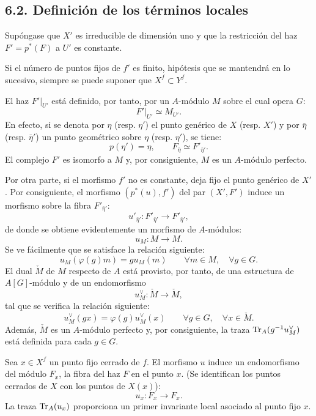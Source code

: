 \subsection*{6.2. Definición de los términos locales}
Supóngase que $X'$ es irreducible de dimensión uno y que la restricción del haz $F'=p^*(F)$ a $U'$ es constante.

Si el número de puntos fijos de $f'$ es finito, hipótesis que se mantendrá en lo sucesivo, siempre se puede suponer que $X^f \subset Y^f$.

El haz $F'|_{U'}$ está definido, por tanto, por un $A$-módulo $M$ sobre el cual opera $G$:
\[
F'|_{U'} \simeq M_{U'} .
\]
En efecto, si se denota por $\eta$ (resp. $\eta'$) el punto genérico de $X$ (resp. $X'$) y por $\bar\eta$ (resp. $\bar\eta'$) un punto geométrico sobre $\eta$ (resp. $\eta'$), se tiene:
\[
p(\eta')=\eta,\qquad F_{\bar\eta} \simeq F'_{\bar\eta'} .
\]
El complejo $F'$ es isomorfo a $M$ y, por consiguiente, $M$ es un $A$-módulo perfecto.

Por otra parte, si el morfismo $f'$ no es constante, deja fijo el punto genérico de $X'$. Por consiguiente, el morfismo $(p^*(u),f')$ del par $(X',F')$ induce un morfismo sobre la fibra $F'_{\bar\eta'}$:
\[
u'_{\bar\eta'}:F'_{\bar\eta'}\longrightarrow F'_{\bar\eta'} ,
\]
de donde se obtiene evidentemente un morfismo de $A$-módulos:
\[
u_M:M\longrightarrow M .
\]
Se ve fácilmente que se satisface la relación siguiente:
\begin{equation}\tag{6.2.1}
u_M(\varphi(g)m)=g u_M(m) \qquad \forall m\in M,\quad \forall g\in G .
\end{equation}
El dual $\check{M}$ de $M$ respecto de $A$ está provisto, por tanto, de una estructura de $A[G]$-módulo y de un endomorfismo
\[
u_M^\vee:\check{M}\longrightarrow \check{M} ,
\]
tal que se verifica la relación siguiente:
\[
u_M^\vee(gx)=\varphi(g)u_M^\vee(x) \qquad \forall g\in G,\quad \forall x\in \check{M} .
\]
Además, $\check{M}$ es un $A$-módulo perfecto y, por consiguiente, la traza $\operatorname{Tr}_A(g^{-1}u_M^\vee)$ está definida para cada $g\in G$.

Sea $x\in X^f$ un punto fijo cerrado de $f$. El morfismo $u$ induce un endomorfismo del módulo $F_x$, la fibra del haz $F$ en el punto $x$. (Se identifican los puntos cerrados de $X$ con los puntos de $X(x)$):
\[
u_x:F_x\longrightarrow F_x .
\]
La traza $\operatorname{Tr}_A(u_x)$ proporciona un primer invariante local asociado al punto fijo $x$.

